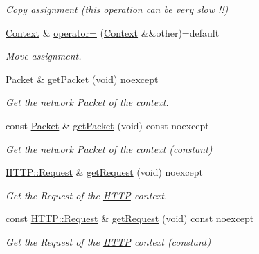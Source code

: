 \begin{DoxyCompactItemize}
\begin{DoxyCompactList}\small\item\em Copy assignment (this operation can be very slow !!) \end{DoxyCompactList}\item 
\mbox{\hyperlink{classo_z_1_1_context}{Context}} \& \mbox{\hyperlink{classo_z_1_1_context_a8167016ce7db8d884383b113bb678736}{operator=}} (\mbox{\hyperlink{classo_z_1_1_context}{Context}} \&\&other)=default
\begin{DoxyCompactList}\small\item\em Move assignment. \end{DoxyCompactList}\item 
\mbox{\hyperlink{classo_z_1_1_packet}{Packet}} \& \mbox{\hyperlink{classo_z_1_1_context_ad2814c8e2b850cb4c5a70a964dbd3d58}{get\+Packet}} (void) noexcept
\begin{DoxyCompactList}\small\item\em Get the network \mbox{\hyperlink{classo_z_1_1_packet}{Packet}} of the context. \end{DoxyCompactList}\item 
const \mbox{\hyperlink{classo_z_1_1_packet}{Packet}} \& \mbox{\hyperlink{classo_z_1_1_context_a25918977b74de5fc3874d38a2f235ba2}{get\+Packet}} (void) const noexcept
\begin{DoxyCompactList}\small\item\em Get the network \mbox{\hyperlink{classo_z_1_1_packet}{Packet}} of the context (constant) \end{DoxyCompactList}\item 
\mbox{\hyperlink{classo_z_1_1_h_t_t_p_1_1_request}{H\+T\+T\+P\+::\+Request}} \& \mbox{\hyperlink{classo_z_1_1_context_af3d2d70a75f5f637a06ec5205e78758c}{get\+Request}} (void) noexcept
\begin{DoxyCompactList}\small\item\em Get the Request of the \mbox{\hyperlink{namespaceo_z_1_1_h_t_t_p}{H\+T\+TP}} context. \end{DoxyCompactList}\item 
const \mbox{\hyperlink{classo_z_1_1_h_t_t_p_1_1_request}{H\+T\+T\+P\+::\+Request}} \& \mbox{\hyperlink{classo_z_1_1_context_afa1b9ec6afd21b7e620e7fe1f4c14e86}{get\+Request}} (void) const noexcept
\begin{DoxyCompactList}\small\item\em Get the Request of the \mbox{\hyperlink{namespaceo_z_1_1_h_t_t_p}{H\+T\+TP}} context (constant) \end{DoxyCompactList}\item 

\end{DoxyCompactItemize}
